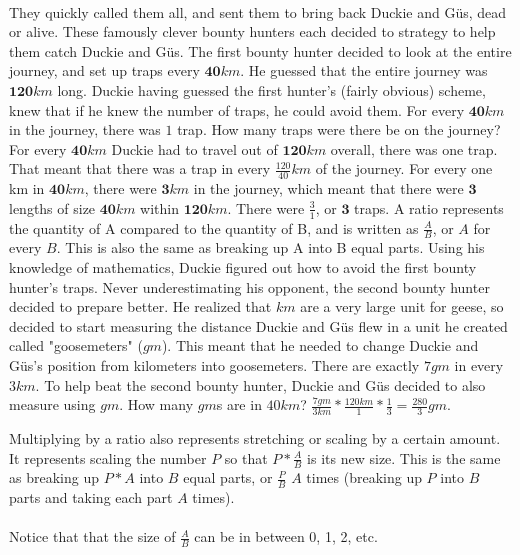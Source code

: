 \paragraph{} They quickly called them all, and sent them to bring back Duckie and G{\"u}s, dead or alive. These famously clever bounty hunters each decided to strategy to help them catch Duckie and G{\"u}s.
\vfill
\pagebreak
{The first bounty hunter decided to look at the entire journey, and set up traps every $\mathbf{40} km$. He guessed that the entire journey was $\mathbf{120} km$ long. Duckie having guessed the first hunter's (fairly obvious) scheme, knew that if he knew the number of traps, he could avoid them. For every $\mathbf{40}km$ in the journey, there was $1$ trap. How many traps were there be on the journey?}
{For every $\textbf{40} km$ Duckie had to travel out of $\textbf{120} km$ overall, there was one trap. That meant that there was a trap in every $\frac{120}{40} km$ of the journey. For every one km in $\textbf{40} km$, there were $\textbf{3} km$ in the journey, which meant that there were $\textbf{3}$ lengths of size $\textbf{40} km$ within $\textbf{120} km$. There were $\frac{3}{1}$, or $\textbf{3}$ traps.}
{A ratio represents the quantity of A compared to the quantity of B, and is written as $\frac{A}{B}$, or $A$ for every $B$. This is also the same as breaking up A into B equal parts.}
{}
{Using his knowledge of mathematics, Duckie figured out how to avoid the first bounty hunter's traps. Never underestimating his opponent, the second bounty hunter decided to prepare better. He realized that $km$ are a very large unit for geese, so decided to start measuring the distance Duckie and G{\"u}s flew in a unit he created called "goosemeters" ($gm$). This meant that he needed to change Duckie and G{\"u}s's position from kilometers into goosemeters. There are exactly $7 gm$ in every $3 km$. To help beat the second bounty hunter, Duckie and G{\"u}s decided to also measure using $gm$. How many $gm$s are in $40 km$?}
{$\frac{7 gm}{3 km}\ast\frac{120 km}{1}\ast\frac{1}{3}=\frac{280}{3} gm$.}
{Multiplying by a ratio also represents stretching or scaling by a certain amount. It represents scaling the number $P$ so that $P\ast\frac{A}{B}$ is its new size. This is the same as breaking up $P\ast A$ into $B$ equal parts, or $\frac{P}{B}$ $A$ times (breaking up $P$ into $B$ parts and taking each part $A$ times).\paragraph{} Notice that that the size of $\frac{A}{B}$ can be in between 0, 1, 2, etc.}
